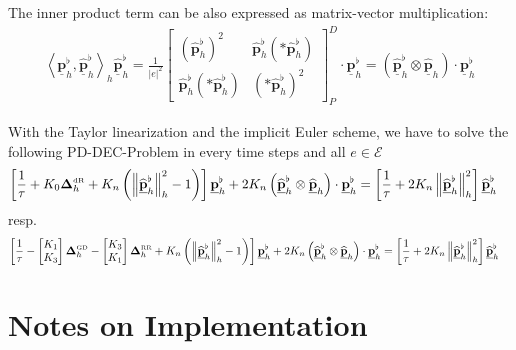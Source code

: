 \documentclass[a4paper,11pt]{scrartcl}
\newcommand{\pflhOld}{\widehat{\mathbf{p}}^{\flat}_{h}}
\newcommand{\PDpflh}{\underline{\mathbf{p}}^{\flat}_{h}}
\newcommand{\PDpflhOld}{\underline{\widehat{\mathbf{p}}}^{\flat}_{h}}
\newcommand{\PDphOld}{\underline{\widehat{\mathbf{p}}}_{h}}
\newcommand{\LB}{\boldsymbol{\Delta}^{\text{\tiny RR}}}
\newcommand{\LCB}{\boldsymbol{\Delta}^{\text{\tiny GD}}}
\newcommand{\LDR}{\boldsymbol{\Delta}^{\text{\tiny dR}}}
\newcommand{\LBh}{\LB_{h}}
\newcommand{\LCBh}{\LCB_{h}}
\newcommand{\LDRh}{\LDR_{h}}
\newcommand{\E}{\mathcal{E}}
\begin{document}
    The inner product term can be also expressed as matrix-vector multiplication:
    \begin{align}
      \left\langle \PDpflh, \PDpflhOld \right\rangle_{h}\PDpflhOld
        = \frac{1}{\left| e \right|^{2}}
            \begin{bmatrix}
              \left( \pflhOld \right)^{2} & \pflhOld\left( *\pflhOld  \right) \\
              \pflhOld\left( *\pflhOld  \right) & \left( * \pflhOld \right)^{2}
            \end{bmatrix}_{P}^{D} \cdot \PDpflh
        = \left( \PDpflhOld \otimes \PDphOld \right) \cdot \PDpflh
    \end{align}

    With the Taylor linearization and the implicit Euler scheme, we have to solve the following PD-DEC-Problem in every time steps and all \( e\in\E \)
    \begin{align}
      \left[ \frac{1}{\tau} + K_{0}\LDRh + K_{n}\left( \left\| \PDpflhOld \right\|_{h}^{2} - 1 \right) \right]\PDpflh
          + 2K_{n} \left( \PDpflhOld \otimes \PDphOld \right) \cdot \PDpflh
          &= \left[\frac{1}{\tau} + 2K_{n}\left\| \PDpflhOld \right\|_{h}^{2}\right]\PDpflhOld
    \end{align}
    resp.
    \begin{align} 
      \left[ \frac{1}{\tau}
          - \begin{bmatrix}
               K_{1} \\ K_{3}
            \end{bmatrix} \LCBh
            -\begin{bmatrix}
               K_{3} \\ K_{1}
            \end{bmatrix} \LBh
          + K_{n}\left( \left\| \PDpflhOld \right\|_{h}^{2} - 1 \right) \right]\PDpflh
          + 2K_{n} \left( \PDpflhOld \otimes \PDphOld \right) \cdot \PDpflh
          &= \left[\frac{1}{\tau} + 2K_{n}\left\| \PDpflhOld \right\|_{h}^{2}\right]\PDpflhOld
    \end{align}

    
\section{Notes on Implementation}
\end{document}
